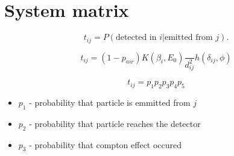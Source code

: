\section{System matrix}
\begin{equation}
t_{ij} =  P(\textrm{detected in } i | \textrm{emitted from } j).
\end{equation}

\begin{equation}
  t_{ij} =  (1-p_{air})  K(\beta_{i},E_{0}) \frac{}{d^{2}_{ij}} h(\delta_{ij}, \phi)
\end{equation}


\begin{equation}
  t_{ij} =  p_{1}p_{2}p_{3}p_{4}p_{5}
\end{equation}

\begin{itemize}
  \item $p_{1}$ - probability that particle is emmitted from $j$
  \item $p_{2}$ - probability that particle reaches the detector
  \item $p_{3}$ - probability that compton effect occured
\end{itemize}
